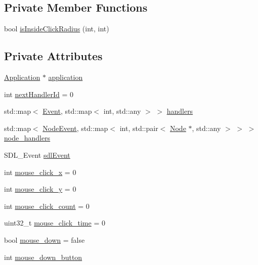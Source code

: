 \subsection*{Private Member Functions}
\begin{DoxyCompactItemize}
\item 
bool \mbox{\hyperlink{classsage_1_1EventDispatcher_a918e15fc278d82e1826c5da31b6cc897}{is\+Inside\+Click\+Radius}} (int, int)
\end{DoxyCompactItemize}
\subsection*{Private Attributes}
\begin{DoxyCompactItemize}
\item 
\mbox{\hyperlink{classsage_1_1Application}{Application}} $\ast$ \mbox{\hyperlink{classsage_1_1EventDispatcher_a0c9ea12254c6806bd4252e0e336e7c81}{application}}
\item 
int \mbox{\hyperlink{classsage_1_1EventDispatcher_a45a41623356399b6a9afa584762e1897}{next\+Handler\+Id}} = 0
\item 
std\+::map$<$ \mbox{\hyperlink{namespacesage_afe706a25026cc74fe69b56d53a265d29}{Event}}, std\+::map$<$ int, std\+::any $>$ $>$ \mbox{\hyperlink{classsage_1_1EventDispatcher_ad1e2836de57436c39769b2792f8d97ba}{handlers}}
\item 
std\+::map$<$ \mbox{\hyperlink{namespacesage_ad2c7b0e1ebf67f572d43620e6b07aa13}{Node\+Event}}, std\+::map$<$ int, std\+::pair$<$ \mbox{\hyperlink{classsage_1_1Node}{Node}} $\ast$, std\+::any $>$ $>$ $>$ \mbox{\hyperlink{classsage_1_1EventDispatcher_aefdb6a3e004a7bec95ae6f0845ba8d05}{node\+\_\+handlers}}
\item 
S\+D\+L\+\_\+\+Event \mbox{\hyperlink{classsage_1_1EventDispatcher_acc93b97b0ed92a64ab2e2040dc8ca04c}{sdl\+Event}}
\item 
int \mbox{\hyperlink{classsage_1_1EventDispatcher_a744f0db4a213a5e9d90316f991b10bcf}{mouse\+\_\+click\+\_\+x}} = 0
\item 
int \mbox{\hyperlink{classsage_1_1EventDispatcher_abf2ef4959095c77e28cd363b53d0cab2}{mouse\+\_\+click\+\_\+y}} = 0
\item 
int \mbox{\hyperlink{classsage_1_1EventDispatcher_ab66ab2cbe57fd5a7d04c130a25e042dd}{mouse\+\_\+click\+\_\+count}} = 0
\item 
uint32\+\_\+t \mbox{\hyperlink{classsage_1_1EventDispatcher_ae59ac77950d2ab74ad826220fa147ec7}{mouse\+\_\+click\+\_\+time}} = 0
\item 
bool \mbox{\hyperlink{classsage_1_1EventDispatcher_add0d3b2e04a6b55fb79bb9cee798661c}{mouse\+\_\+down}} = false
\item 
int \mbox{\hyperlink{classsage_1_1EventDispatcher_ab4e7abdcd8cedf5ecf3a662b762cf7a5}{mouse\+\_\+down\+\_\+button}}
\end{DoxyCompactItemize}


